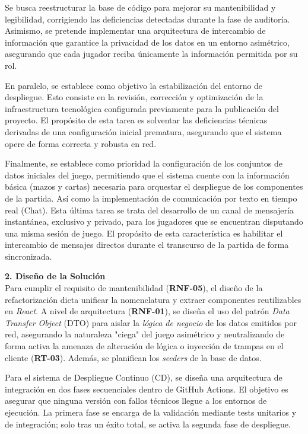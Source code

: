 Se busca reestructurar la base de código para mejorar su mantenibilidad y legibilidad, corrigiendo las deficiencias detectadas durante la fase de auditoría. Asimismo, se pretende implementar una arquitectura de intercambio de información que garantice la privacidad de los datos en un entorno asimétrico, asegurando que cada jugador reciba únicamente la información permitida por su rol. 

En paralelo, se establece como objetivo la estabilización del entorno de despliegue. Esto consiste en la revisión, corrección y optimización de la infraestructura tecnológica configurada previamente para la publicación del proyecto. El propósito de esta tarea es solventar las deficiencias técnicas derivadas de una configuración inicial prematura, asegurando que el sistema opere de forma correcta y robusta en red. 

Finalmente, se establece como prioridad la configuración de los conjuntos de datos iniciales del juego, permitiendo que el sistema cuente con la información básica (mazos y cartas) necesaria para orquestar el despliegue de los componentes de la partida. Así como la implementación de comunicación por texto en tiempo real (Chat). Esta última tarea se trata del desarrollo de un canal de mensajería instantánea, exclusivo y privado, para los jugadores que se encuentran disputando una misma sesión de juego. El propósito de esta característica es habilitar el intercambio de mensajes directos durante el transcurso de la partida de forma sincronizada.

\textbf{2. Diseño de la Solución} \\
Para cumplir el requisito de mantenibilidad (\textbf{RNF-05}), el diseño de la refactorización dicta unificar la nomenclatura y extraer componentes reutilizables en \textit{React}. A nivel de arquitectura (\textbf{RNF-01}), se diseña el uso del patrón \textit{Data Transfer Object} (DTO) para aislar la \textit{lógica de negocio} de los datos emitidos por red, asegurando la naturaleza "ciega" del juego asimétrico y neutralizando de forma activa la amenaza de alteración de lógica o inyección de trampas en el cliente (\textbf{RT-03}). Además, se planifican los \textit{seeders} de la base de datos.

Para el sistema de Despliegue Continuo (CD), se diseña una arquitectura de integración en dos fases secuenciales dentro de GitHub Actions. El objetivo es asegurar que ninguna versión con fallos técnicos llegue a los entornos de ejecución. La primera fase se encarga de la validación mediante tests unitarios y de integración; solo tras un éxito total, se activa la segunda fase de despliegue.

